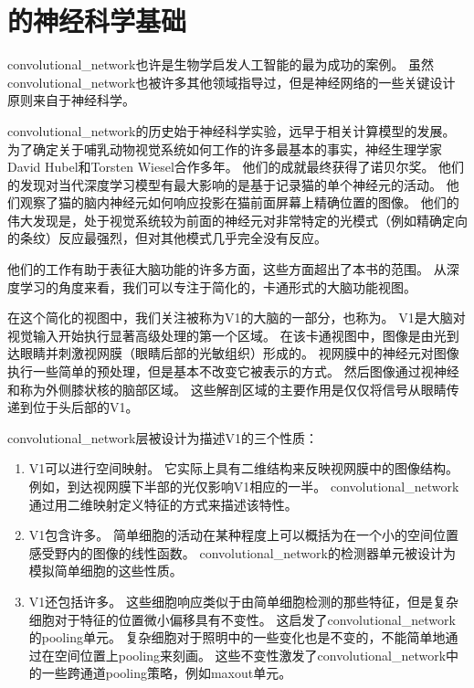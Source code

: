 \section{的神经科学基础}
\label{sec:the_neuroscientific_basis_for_convolutional_networks}

\gls{convolutional_network}也许是生物学启发人工智能的最为成功的案例。
虽然\gls{convolutional_network}也被许多其他领域指导过，但是神经网络的一些关键设计原则来自于神经科学。

\gls{convolutional_network}的历史始于神经科学实验，远早于相关计算模型的发展。
为了确定关于哺乳动物视觉系统如何工作的许多最基本的事实，神经生理学家David Hubel和Torsten Wiesel合作多年\citep{Hubel+Wiesel-1959,Hubel62,Hubel+Wiesel-1968}。
他们的成就最终获得了诺贝尔奖。
他们的发现对当代深度学习模型有最大影响的是基于记录猫的单个神经元的活动。
他们观察了猫的脑内神经元如何响应投影在猫前面屏幕上精确位置的图像。
他们的伟大发现是，处于视觉系统较为前面的神经元对非常特定的光模式（例如精确定向的条纹）反应最强烈，但对其他模式几乎完全没有反应。

他们的工作有助于表征大脑功能的许多方面，这些方面超出了本书的范围。
从深度学习的角度来看，我们可以专注于简化的，卡通形式的大脑功能视图。

在这个简化的视图中，我们关注被称为V1的大脑的一部分，也称为。
V1是大脑对视觉输入开始执行显著高级处理的第一个区域。
在该卡通视图中，图像是由光到达眼睛并刺激视网膜（眼睛后部的光敏组织）形成的。
视网膜中的神经元对图像执行一些简单的预处理，但是基本不改变它被表示的方式。
然后图像通过视神经和称为外侧膝状核的脑部区域。 
这些解剖区域的主要作用是仅仅将信号从眼睛传递到位于头后部的V1。
 
 
\gls{convolutional_network}层被设计为描述V1的三个性质：
\begin{enumerate}
  \item V1可以进行空间映射。
  它实际上具有二维结构来反映视网膜中的图像结构。
  例如，到达视网膜下半部的光仅影响V1相应的一半。 
  \gls{convolutional_network}通过用二维映射定义特征的方式来描述该特性。

  \item V1包含许多。
  简单细胞的活动在某种程度上可以概括为在一个小的空间位置感受野内的图像的线性函数。
  \gls{convolutional_network}的检测器单元被设计为模拟简单细胞的这些性质。

  \item V1还包括许多。
  这些细胞响应类似于由简单细胞检测的那些特征，但是复杂细胞对于特征的位置微小偏移具有不变性。 
  这启发了\gls{convolutional_network}的\gls{pooling}单元。
  复杂细胞对于照明中的一些变化也是不变的，不能简单地通过在空间位置上\gls{pooling}来刻画。 
  这些不变性激发了\gls{convolutional_network}中的一些跨通道\gls{pooling}策略，例如maxout单元\citep{Goodfellow-et-al-ICML2013}。
\end{enumerate}

